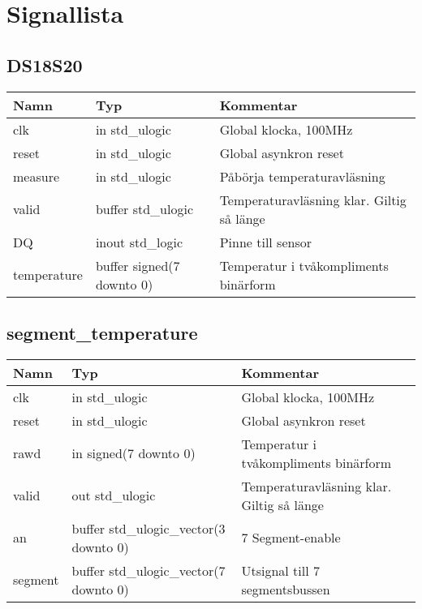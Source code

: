 \section{Signallista}
\subsection{DS18S20}
\begin{table}[H]
	\begin{tabularx}{\textwidth}{p{2cm} p{4.3cm} X}
		\hline
		\textbf{Namn} & \textbf{Typ} & \textbf{Kommentar} \\
		\hline
		clk & in std\_ulogic & Global klocka, 100MHz \\
		reset & in std\_ulogic & Global asynkron reset \\
		measure & in std\_ulogic & Påbörja temperaturavläsning \\
		valid & buffer std\_ulogic & Temperaturavläsning klar. 
			Giltig så länge \signal{valid = '1'} \\
		DQ & inout std\_logic & Pinne till sensor \\
		temperature & buffer signed(7 downto 0) & Temperatur i tvåkompliments binärform \\
		\hline
	\end{tabularx}
\end{table}


\subsection{segment\_temperature}
\begin{table}[H]
	\begin{tabularx}{\textwidth}{p{2cm} p{4.3cm} X}
		\hline
		\textbf{Namn} & \textbf{Typ} & \textbf{Kommentar} \\
		\hline
		clk & in std\_ulogic & Global klocka, 100MHz \\
		reset & in std\_ulogic & Global asynkron reset \\
		rawd & in signed(7 downto 0) & Temperatur i tvåkompliments binärform \\
		valid & out std\_ulogic & Temperaturavläsning klar. 
			Giltig så länge \signal{valid = '1'} \\
		an & buffer std\_ulogic\_vector(3 downto 0) & 7 Segment-enable \\
		segment & buffer std\_ulogic\_vector(7 downto 0) & Utsignal till 7 segmentsbussen \\
		\hline
	\end{tabularx}
\end{table}

